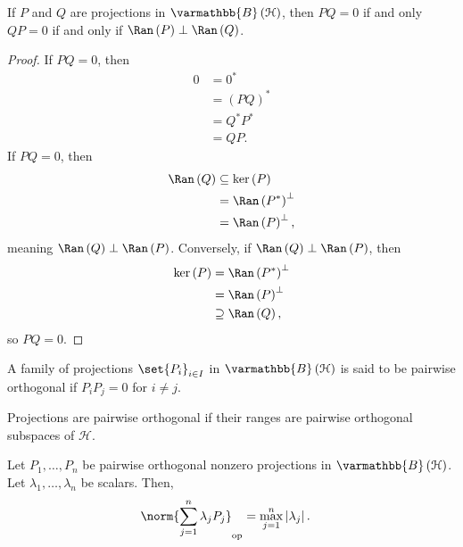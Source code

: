 \documentclass[10pt]{mypackage}
\renewcommand*{\mathbb}[1]{\varmathbb{#1}}
\newcommand{\B}{\mathbb{B}}
\begin{document}
\begin{lemma}
  If $P$ and $Q$ are projections in $\B\left(\mathcal{H}\right)$, then $PQ = 0$ if and only $QP = 0$ if and only if $\Ran\left(P\right)\perp \Ran\left(Q\right)$.
\end{lemma}
\begin{proof}
  If $PQ = 0$, then 
  \begin{align*}
    0 &= 0^{\ast}\\
      &= \left(PQ\right)^{\ast}\\
      &= Q^{\ast}P^{\ast}\\
      &= QP.
  \end{align*}
  If $PQ = 0$, then 
  \begin{align*}
    \Ran\left(Q\right) &\subseteq \ker\left(P\right)\\
                       &= \Ran\left(P^{\ast}\right)^{\perp}\\
                       &= \Ran\left(P\right)^{\perp},
  \end{align*}
  meaning $\Ran\left(Q\right) \perp \Ran\left(P\right)$. Conversely, if $\Ran\left(Q\right)\perp \Ran\left(P\right)$, then
  \begin{align*}
    \ker\left(P\right) &= \Ran\left(P^{\ast}\right)^{\perp}\\
                       &= \Ran\left(P\right)^{\perp}\\
                       &\supseteq \Ran\left(Q\right),
  \end{align*}
  so $PQ = 0$.
\end{proof}
\begin{definition}
  A family of projections $\set{P_i}_{i\in I}$ in $\B\left(\mathcal{H}\right)$ is said to be pairwise orthogonal if $P_iP_j = 0$ for $i \neq j$.
\end{definition}
Projections are pairwise orthogonal if their ranges are pairwise orthogonal subspaces of $\mathcal{H}$.
\begin{lemma}
  Let $P_1,\dots,P_n$ be pairwise orthogonal nonzero projections in $\B\left(\mathcal{H}\right)$. Let $\lambda_1,\dots,\lambda_n$ be scalars. Then,
  \begin{align*}
    \norm{\sum_{j=1}^{n}\lambda_jP_j}_{\text{op}} &= \max_{j=1}^{n}\left\vert \lambda_j \right\vert.
  \end{align*}
\end{lemma}
\end{document}
